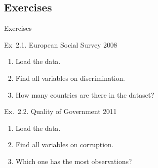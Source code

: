 \documentclass[t]{beamer}
\begin{document}
  \subsection{Exercises}
  
  \begin{frame}{Exercises}

    \begin{exampleblock}{Ex~2.1. European Social Survey 2008}
      \begin{enumerate}
        \item Load the data.
        \item Find all variables on discrimination.
        \item How many countries are there in the dataset?
      \end{enumerate}
    \end{exampleblock}
		
    \begin{exampleblock}{Ex.~2.2. Quality of Government 2011}
      \begin{enumerate}
        \item Load the data.
        \item Find all variables on corruption.
        \item Which one has the most observations?
      \end{enumerate}
    \end{exampleblock}

  \end{frame}
	
\end{document}
